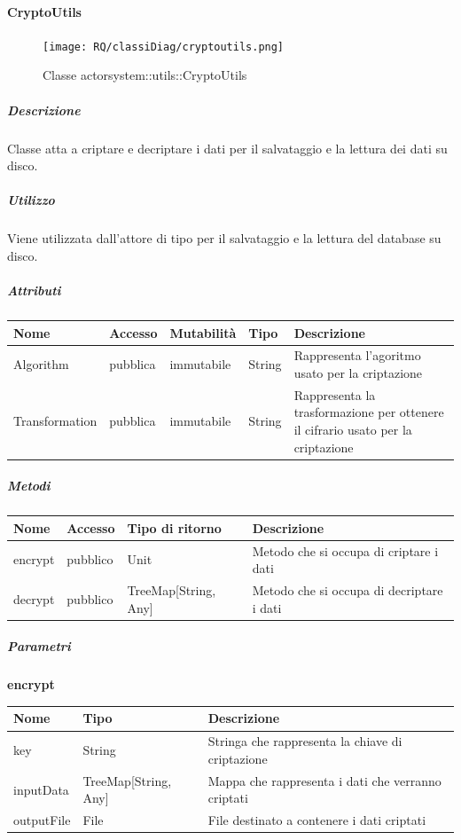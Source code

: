 \documentclass{scalatekids-article}
\begin{document}

\paragraph{CryptoUtils}
\label{sec:actorbase::actorsystem::utils::CryptoUtils}

\begin{figure}[H]
   \begin{center}
     \texttt{[image: RQ/classiDiag/cryptoutils.png]}
     \caption{Classe actorsystem::utils::CryptoUtils}
   \end{center}
 \end{figure}

\subparagraph{Descrizione}
Classe atta a criptare e decriptare i dati per il salvataggio e la lettura dei dati su disco.

\subparagraph{Utilizzo}
Viene utilizzata dall'attore di tipo  per il salvataggio e la lettura del database su disco.

\subparagraph{Attributi}
\begin{tabular}{| p{3cm} | p{1.5cm} | p{2cm} | p{2cm} | p{8.5cm} |}
  \hline
  Nome & Accesso & Mutabilità & Tipo & Descrizione\\
  \hline
  Algorithm & pubblica & immutabile & String & Rappresenta l'agoritmo usato per la criptazione \\
  \hline
  Transformation & pubblica & immutabile & String & Rappresenta la trasformazione per ottenere il cifrario usato per la criptazione \\
  \hline
\end{tabular}

\subparagraph{Metodi}
\begin{tabular}{| p{3cm} | p{1.5cm} | p{3.5cm} | p{9cm} |}
  \hline
  Nome & Accesso & Tipo di ritorno & Descrizione\\
  \hline
  encrypt & pubblico & Unit & Metodo che si occupa di criptare i dati \\
  \hline
  decrypt & pubblico & TreeMap[String, Any] & Metodo che si occupa di decriptare i dati \\
  \hline
\end{tabular}

\subparagraph{Parametri}
\begin{center}
  \textbf{encrypt}\\
\end{center}
\begin{tabular}{| l | l | l |}
  \hline
  Nome & Tipo & Descrizione\\
  \hline
  key & String & Stringa che rappresenta la chiave di criptazione \\
  \hline
  inputData & TreeMap[String, Any] & Mappa che rappresenta i dati che verranno criptati \\
  \hline
  outputFile & File & File destinato a contenere i dati criptati \\
  \hline
\end{tabular}
\end{document}

